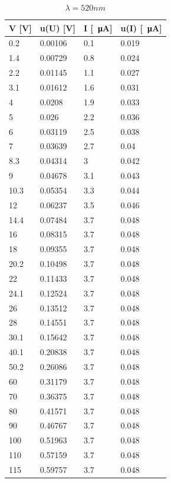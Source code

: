 \begin{table}[H]
    \centering
    \begin{tabular}{l|l|l|l}

        V [V] & u(U) [V] & I [\SI{}{\micro\ampere}] & u(I) [\SI{}{\micro\ampere}] \\ \hline
        0.2 & 0.00106 & 0.1 & 0.019 \\ \hline
        1.4 & 0.00729 & 0.8 & 0.024 \\ \hline
        2.2 & 0.01145 & 1.1 & 0.027 \\ \hline
        3.1 & 0.01612 & 1.6 & 0.031 \\ \hline
        4 & 0.0208 & 1.9 & 0.033 \\ \hline
        5 & 0.026 & 2.2 & 0.036 \\ \hline
        6 & 0.03119 & 2.5 & 0.038 \\ \hline
        7 & 0.03639 & 2.7 & 0.04 \\ \hline
        8.3 & 0.04314 & 3 & 0.042 \\ \hline
        9 & 0.04678 & 3.1 & 0.043 \\ \hline
        10.3 & 0.05354 & 3.3 & 0.044 \\ \hline
        12 & 0.06237 & 3.5 & 0.046 \\ \hline
        14.4 & 0.07484 & 3.7 & 0.048 \\ \hline
        16 & 0.08315 & 3.7 & 0.048 \\ \hline
        18 & 0.09355 & 3.7 & 0.048 \\ \hline
        20.2 & 0.10498 & 3.7 & 0.048 \\ \hline
        22 & 0.11433 & 3.7 & 0.048 \\ \hline
        24.1 & 0.12524 & 3.7 & 0.048 \\ \hline
        26 & 0.13512 & 3.7 & 0.048 \\ \hline
        28 & 0.14551 & 3.7 & 0.048 \\ \hline
        30.1 & 0.15642 & 3.7 & 0.048 \\ \hline
        40.1 & 0.20838 & 3.7 & 0.048 \\ \hline
        50.2 & 0.26086 & 3.7 & 0.048 \\ \hline
        60 & 0.31179 & 3.7 & 0.048 \\ \hline
        70 & 0.36375 & 3.7 & 0.048 \\ \hline
        80 & 0.41571 & 3.7 & 0.048 \\ \hline
        90 & 0.46767 & 3.7 & 0.048 \\ \hline
        100 & 0.51963 & 3.7 & 0.048 \\ \hline
        110 & 0.57159 & 3.7 & 0.048 \\ \hline
        115 & 0.59757 & 3.7 & 0.048 \\ 
    \end{tabular}
    \caption{$\lambda = 520 nm $}
\end{table}


